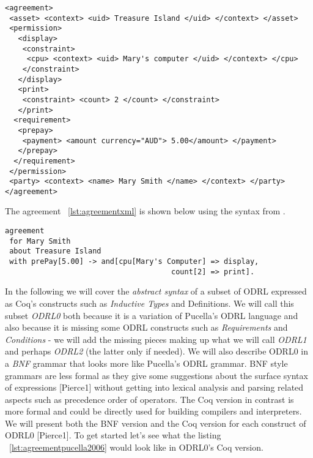 \lstset{language=XML}
\begin{lstlisting}[caption={agreement for Mary Smith in XML},label={lst:agreementxml}]
<agreement>
 <asset> <context> <uid> Treasure Island </uid> </context> </asset>
 <permission>
   <display>
    <constraint>
     <cpu> <context> <uid> Mary's computer </uid> </context> </cpu>
    </constraint>
   </display>
   <print>
    <constraint> <count> 2 </count> </constraint>
   </print>
  <requirement>
   <prepay>
    <payment> <amount currency="AUD"> 5.00</amount> </payment>
   </prepay>
  </requirement>
 </permission>
 <party> <context> <name> Mary Smith </name> </context> </party>
</agreement>
\end{lstlisting}

The agreement ~\ref{lst:agreementxml} is shown below using the syntax from \cite{pucella2006}.

\lstset{language=Pucella2006}
\begin{minipage}[c]{0.95\textwidth}
\begin{lstlisting}[frame=single, caption={agreement for Mary Smith as BNF (as used in ~\cite{pucella2006})},label={lst:agreementpucella2006}]
agreement
 for Mary Smith 
 about Treasure Island 
 with prePay[5.00] -> and[cpu[Mary's Computer] => display,
                                      count[2] => print].
\end{lstlisting}
\end{minipage} 

In the following we will cover the \emph{abstract syntax} of a subset of ODRL expressed as Coq's constructs such as \emph{Inductive Types} and Definitions. We will call this subset \emph{ODRL0} both because it is a variation of Pucella's ODRL language and also because it is missing some ODRL constructs such as \emph{Requirements} and \emph{Conditions} - we will add the missing pieces making up what we will call \emph{ODRL1} and perhaps \emph{ODRL2} (the latter only if needed). We will also describe ODRL0 in a \emph{BNF} grammar that looks more like Pucella's ODRL grammar. BNF style grammars are less formal as they give some suggestions about the surface syntax of expressions [Pierce1] without getting into lexical analysis and parsing related aspects such as precedence order of operators. The Coq version in contrast is more formal and could be directly used for building compilers and interpreters. We will present both the BNF version and the Coq version for each construct of ODRL0 [Pierce1]. To get started let's see what the listing ~\ref{lst:agreementpucella2006} would look like in ODRL0's Coq version.

